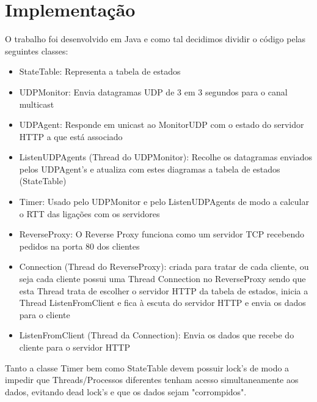 \documentclass{article}
\begin{document}
\section{Implementação}
O trabalho foi desenvolvido em Java e como tal decidimos dividir o código pelas seguintes classes:
\begin{itemize}
	\item StateTable: Representa a tabela de estados
    \item UDPMonitor: Envia datagramas UDP de 3 em 3 segundos para o canal multicast 
    \item UDPAgent: Responde em unicast ao MonitorUDP com o estado do servidor HTTP a que está associado
    \item ListenUDPAgents (Thread do UDPMonitor): Recolhe os datagramas enviados pelos UDPAgent's e atualiza com estes diagramas a tabela de estados (StateTable)
    \item Timer: Usado pelo UDPMonitor e pelo ListenUDPAgents de modo a calcular o RTT das ligações com os servidores
    \item ReverseProxy: O Reverse Proxy funciona como um servidor TCP recebendo pedidos na porta 80 dos clientes
    \item Connection (Thread do ReverseProxy): criada para tratar de cada cliente, ou seja cada cliente possui uma Thread Connection no ReverseProxy sendo que esta Thread trata de escolher o servidor HTTP da tabela de estados, inicia a Thread ListenFromClient e fica à escuta do servidor HTTP e envia os dados para o cliente
    \item ListenFromClient (Thread da Connection): Envia os dados que recebe do cliente para o servidor HTTP
\end{itemize}
Tanto a classe Timer bem como StateTable devem possuir lock's de modo a impedir que Threads/Processos diferentes tenham acesso simultaneamente aos dados, evitando dead lock's e que os dados sejam "corrompidos".
\end{document}
